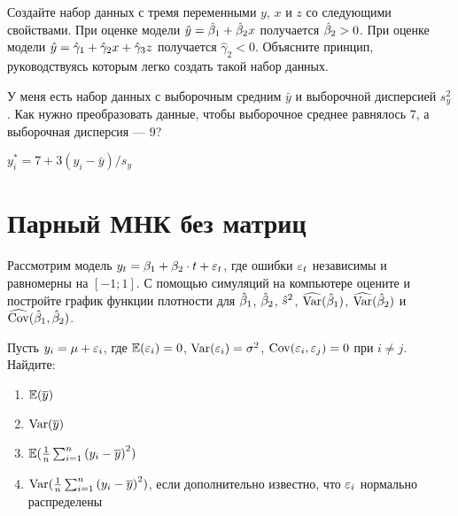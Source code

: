 \documentclass[pdftex,11pt,openany]{book}\usepackage[]{graphicx}\usepackage[]{color}
\begin{document}
\begin{problem}
  Создайте набор данных с тремя переменными $y$, $x$ и $z$ со следующими свойствами. При оценке модели $\hat{y}=\hat{\beta}_1+\hat{\beta}_2 x$ получается $\hat{\beta}_2>0$. При оценке модели $\hat{y}=\hat{\gamma}_1+ \hat{\gamma}_2 x+\hat{\gamma}_3 z$ получается $\hat{\gamma}_2<0$. Объясните принцип, руководствуясь которым легко создать такой набор данных.
\end{problem}

\begin{solution}
\end{solution}


\begin{problem}
 У меня есть набор данных с выборочным средним $\bar{y}$ и выборочной дисперсией $s_y^2$. Как нужно преобразовать данные, чтобы выборочное среднее равнялось $7$, а выборочная дисперсия --- $9$? 
\end{problem}

\begin{solution}
 $y_i^*=7+3(y_i-\bar{y})/s_y$ 
\end{solution}




\chapter{Парный МНК без матриц}


\begin{problem}
 Рассмотрим модель $y_t=\beta_1+\beta_2 \cdot t + \varepsilon_t$, где ошибки $\varepsilon_t$ независимы и равномерны на $[-1;1]$. С помощью симуляций на компьютере оцените и постройте график функции плотности для $\hat{\beta}_1$, $\hat{\beta}_2$, $\hat{s}^2$, $\widehat{\operatorname{Var}}(\hat{\beta}_1)$, $\widehat{\operatorname{Var}}(\hat{\beta}_2)$ и $\widehat{\operatorname{Cov}}(\hat{\beta}_1,\hat{\beta}_2)$. 
\end{problem}
 
\begin{solution}
\end{solution}


\begin{problem}
 Пусть $y_i=\mu+\varepsilon_i$, где $\mathbb{E}(\varepsilon_i)=0$, $\operatorname{Var}(\varepsilon_i)=\sigma^2$, $\operatorname{Cov}(\varepsilon_i,\varepsilon_j)=0$ при $i \ne j$. Найдите:
\begin{enumerate}
\item $\mathbb{E}(\overline{y})$
\item $\operatorname{Var}(\overline{y})$
\item $\mathbb{E}(\frac{1}{n}\sum_{i=1}^n {(y_i-\overline{y})}^2)$
\item $\operatorname{Var}(\frac{1}{n}\sum_{i=1}^n {(y_i-\overline{y})}^2)$, если дополнительно известно, что $\varepsilon_i$ нормально распределены
\end{enumerate}
\end{problem}
 
\end{document}
